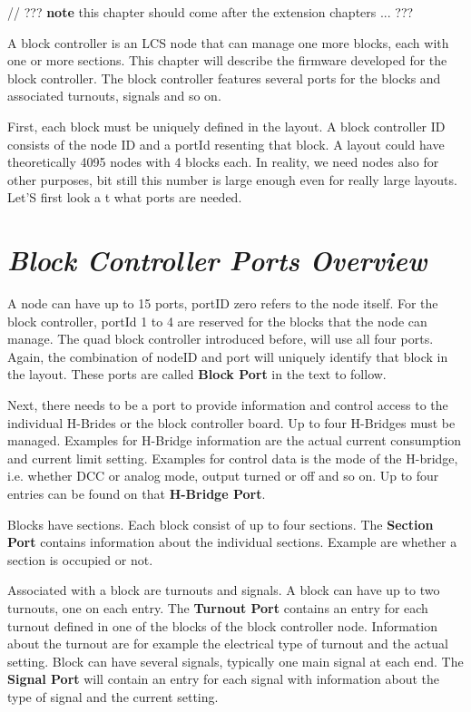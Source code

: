 
// ??? \textbf{note} this chapter should come after the extension chapters ... ???

A block controller is an LCS node that can manage one more blocks, each with one or more sections. This chapter will describe the firmware developed for the block controller. The block controller features several ports for the blocks and associated turnouts, signals and so on.

First, each block must be uniquely defined in the layout. A block controller ID consists of the node ID and a portId resenting that block. A layout could have theoretically 4095 nodes with 4 blocks each. In reality, we need nodes also for other purposes, bit still this number is large enough even for really large layouts. Let'S first look a t what ports are needed.

\section{\textit{Block Controller Ports Overview}}

A node can have up to 15 ports, portID zero refers to the node itself. For the block controller, portId 1 to 4 are reserved for the blocks that the node can manage. The quad block controller introduced before, will use all four ports. Again, the combination of nodeID and port will uniquely identify that block in the layout. These ports are called \textbf{Block Port} in the text to follow.

Next, there needs to be a port to provide information and control access to the individual H-Brides or the block controller board. Up to four H-Bridges must be managed. Examples for H-Bridge information are the actual current consumption and current limit setting. Examples for control data is the mode of the H-bridge, i.e. whether DCC or analog mode, output turned or off and so on. Up to four entries can be found on that \textbf{H-Bridge Port}.

Blocks have sections. Each block consist of up to four sections. The \textbf{Section Port} contains information about the individual sections. Example are whether a section is occupied or not.

Associated with a block are turnouts and signals. A block can have up to two turnouts, one on each entry. The \textbf{Turnout Port} contains an entry for each turnout defined in one of the blocks of the block controller node. Information about the turnout are for example the electrical type of turnout and the actual setting. Block can have several signals, typically one main signal at each end. The \textbf{Signal Port} will contain an entry for each signal with information about the  type of signal and the current setting.

